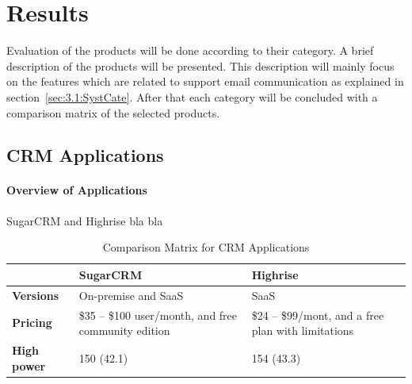 \section{Results}
\label{sec:3.3:Resul}
Evaluation of the products will be done according to their category. A brief description of the products will be presented. This description will mainly focus on the features which are related to support email communication as explained in section~\ref{sec:3.1:SystCate}. After that each category will be concluded with a comparison matrix of the selected products.

\subsection{CRM Applications}
\label{subsec:3.3.1:CRMAppl}

\paragraph{Overview of Applications}
SugarCRM and Highrise bla bla

\begin{table}[!ht]
\begin{center}
	\caption[Comparison Matrix for CRM Applications]{Comparison Matrix for CRM Applications} \label{tab:comp_matr_crm}
    \begin{tabular}{ p{3cm} p{5cm}  p{5cm} }
	\hline
	& \textbf{SugarCRM} & \textbf{Highrise} \\ \hline
	\textbf{Versions} & On-premise and \ac{SaaS} & \ac{SaaS} \\
	\textbf{Pricing} & \$35 -- \$100 user/month, and free community edition & \$24 -- \$99/mont, and a free plan with limitations \\
	\textbf{High power} & 150 (42.1) & 154 (43.3) \\ \hline
    \end{tabular}
\end{center}
\end{table}

